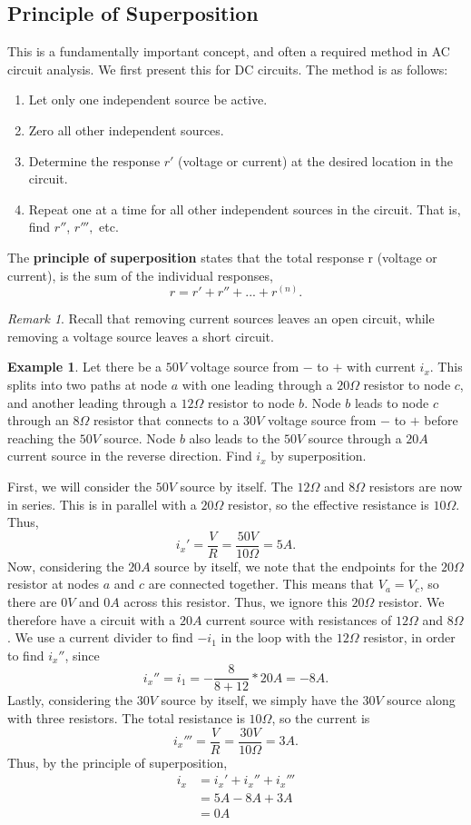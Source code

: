 \documentclass[11pt]{article}
\theoremstyle{plain} %
\theoremstyle{definition}
\theoremstyle{example}
\newtheorem*{example}{Example}
\theoremstyle{remark}
\newtheorem*{remark}{Remark}
\begin{document}
\subsection{Principle of Superposition}

This is a fundamentally important concept, and often a required method in AC circuit analysis. We first present this for DC circuits. The method is as follows:
\begin{enumerate}
	\item Let only one independent source be active.
	\item Zero all other independent sources. 
	\item Determine the response $r'$ (voltage or current) at the desired location in the circuit. 
	\item Repeat one at a time for all other independent sources in the circuit. That is, find $r''$, $r''',$ etc.
\end{enumerate}
The \textbf{principle of superposition} states that the total response r (voltage or current), is the sum of the individual responses,$$r = r'  +r'' + ...+ r^{(n)}.$$
\begin{remark}
Recall that removing current sources leaves an open circuit, while removing a voltage source leaves a short circuit.
\end{remark}
\begin{example}
Let there be a $50V$ voltage source from $-$ to $+$ with current $i_x$. This splits into two paths at node $a$ with one leading through a $20\Omega$ resistor to node $c$, and another leading through a $12\Omega$ resistor to node $b$. Node $b$ leads to node $c$ through an $8\Omega$ resistor that connects to a $30V$ voltage source from $-$ to $+$ before reaching the $50V$ source. Node $b$ also leads to the $50V$ source through a $20A$ current source in the reverse direction. Find $i_x$ by superposition.
\end{example}

First, we will consider the $50V$ source by itself. The $12\Omega$ and $8\Omega$ resistors are now in series. This is in parallel with a $20\Omega$ resistor, so the effective resistance is $10\Omega$. Thus, $$i_x' = \frac{V}{R} = \frac{50V}{10\Omega} = 5A.$$ Now, considering the $20A$ source by itself, we note that the endpoints for the $20\Omega$ resistor at nodes $a$ and $c$ are connected together. This means that $V_a = V_c$, so there are $0V$ and $0A$ across this resistor. Thus, we ignore this $20\Omega$ resistor. We therefore have a circuit with a $20A$ current source with resistances of $12\Omega$ and $8\Omega$. We use a current divider to find $-i_1$ in the loop with the $12\Omega$ resistor, in order to find $i_x''$, since
$$i_x'' = i_1 = -\frac{8}{8+12}*20A = -8A.$$ 
Lastly, considering the $30V$ source by itself, we simply have the $30V$ source along with three resistors. The total resistance is $10\Omega$, so the current is 
$$i_x''' = \frac{V}{R} = \frac{30V}{10\Omega} = 3A.$$
Thus, by the principle of superposition, 
\begin{align*}
i_x &= i_x' + i_x'' + i_x'''\\
&= 5A - 8A + 3A \\&= 0A
\end{align*}
\end{document}
